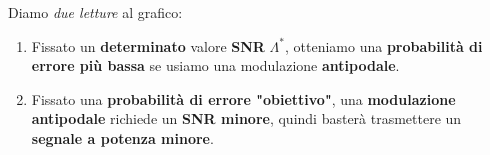 \begin{remark}[CONFRONTO]
    Diamo \textit{due letture} al grafico:
    \begin{enumerate}
        \item Fissato un \textbf{determinato} valore \textbf{SNR} $\Lambda^*$, otteniamo
            una \textbf{probabilità di errore più bassa} se usiamo una
            modulazione \textbf{antipodale}.
        \item Fissato una \textbf{probabilità di errore "obiettivo"}, una
            \textbf{modulazione antipodale} richiede un \textbf{SNR minore},
            quindi basterà trasmettere un \textbf{segnale a potenza minore}.
    \end{enumerate}
\end{remark}
